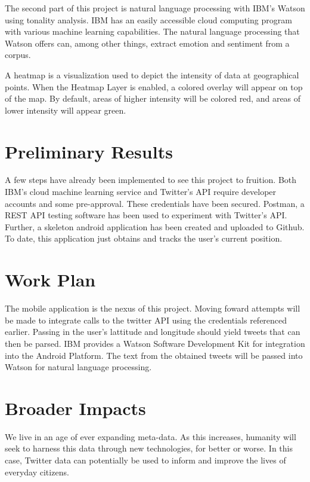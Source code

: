 \documentclass[12pt, oneside]{article}
\begin{document}
The second part of this project is natural language processing with IBM's Watson using tonality analysis.
IBM has an easily accessible cloud computing program with various machine learning capabilities\cite{IBM}. The natural language processing that Watson offers can, among other things, extract emotion and sentiment from a corpus.


A heatmap is a visualization used to depict the intensity of data at
geographical points. When the Heatmap Layer is enabled, a colored overlay will
appear on top of the map. By default, areas of higher intensity will be colored
red, and areas of lower intensity will appear green.


\section{Preliminary Results}
A few steps have already been implemented to see this project to fruition. Both
IBM's cloud machine learning service and Twitter's API require developer
accounts and some pre-approval. These credentials have been secured.
Postman, a REST API testing software has been used to experiment with Twitter's
API\cite{Postman}.
Further, a skeleton android application has been created and uploaded to Github. To date, this application just obtains and tracks the user's current position.

\section{Work Plan}
The mobile application is the nexus of this project. Moving foward attempts will be made to integrate calls to the twitter API using the credentials referenced earlier. Passing in the user's lattitude and longitude should yield tweets that can then be parsed. IBM provides a Watson Software Development Kit for integration into the Android Platform. The text from the obtained tweets will be passed into Watson for natural language processing.


\section{Broader Impacts}
We live in an age of ever expanding meta-data. As this increases, humanity will seek to harness this data through new technologies, for better or worse. In this case, Twitter data can potentially be used to inform and improve the lives of everyday citizens.
\newpage{}

%

\end{document}

